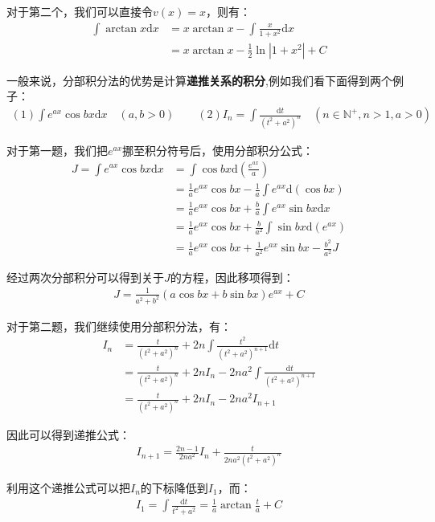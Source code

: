 \documentclass{ctexart}
\let\oldtextbf\textbf %
\renewcommand{\textbf}[1]{\textcolor{btex}{\oldtextbf{#1}}} %
\begin{document}
对于第二个，我们可以直接令$v(x)=x$，则有：
\begin{align*}
    \int \arctan x\mathrm{d}x&=x\arctan x-\int\frac{x}{1+x^2} \mathrm{d}x\\
& =x\arctan x-\frac{1}{2}\ln|1+x^2|+C      
\end{align*}

一般来说，分部积分法的优势是计算\textbf{递推关系的积分},例如我们看下面得到两个例子：
\begin{align*}
   (1) \int e^{ax}\cos bx\mathrm{d}x\quad (a,b>0)\qquad 
   (2)I_n=\int\frac{\mathrm{d}t}{(t^2+a^2)^n}\quad (n\in \mathbb{N^+},n>1,a>0)
\end{align*}

对于第一题，我们把$e^{ax}$挪至积分符号后，使用分部积分公式：
\begin{align*}
  J=  \int e^{ax}\cos bx\mathrm{d}x&=\int\cos bx \mathrm{d}(\frac{e^{ax}}{a})\\
&=\frac{1}{a}e^{ax}\cos bx-\frac{1}{a} \int e^{ax}\mathrm{d}(\cos bx)\\
&=   \frac{1}{a}e^{ax}\cos bx+\frac{b}{a}\int e^{ax}\sin bx\mathrm{d}x\\
&=  \frac{1}{a}e^{ax}\cos bx+\frac{b}{a^2}\int \sin bx\mathrm{d}(e^{ax})\\
&=\frac{1}{a}e^{ax}\cos bx+\frac{1}{a^2}e^{ax}\sin bx-\frac{b^2}{a^2}J
\end{align*}

经过两次分部积分可以得到关于$J$的方程，因此移项得到：
\begin{align*}
    J=\frac{1}{a^2+b^2}(a\cos bx+b\sin bx)e^{ax}+C
\end{align*}

对于第二题，我们继续使用分部积分法，有：
\begin{align*}
  I_n&=\frac{t}{(t^2+a^2)^n}+2n\int\frac{t^2}{(t^2+a^2)^{n+1}}\mathrm{d}t\\
&=\frac{t}{(t^2+a^2)^n}+2nI_n-2na^2\int\frac{\mathrm{d}t}{(t^2+a^2)^{n+1}}\\
&=   \frac{t}{(t^2+a^2)^n}+2nI_n-2na^2I_{n+1}  
\end{align*}

因此可以得到递推公式：
\begin{align*}
    I_{n+1}=\frac{2n-1}{2na^2}I_n+\frac{t}{2na^2(t^2+a^2)^n}
\end{align*}

利用这个递推公式可以把$I_n$的下标降低到$I_1$，而：
\begin{align*}
    I_1=\int\frac{\mathrm{d}t}{t^2+a^2}=\frac{1}{a}\arctan\frac{t}{a}+C
\end{align*}
\end{document}
